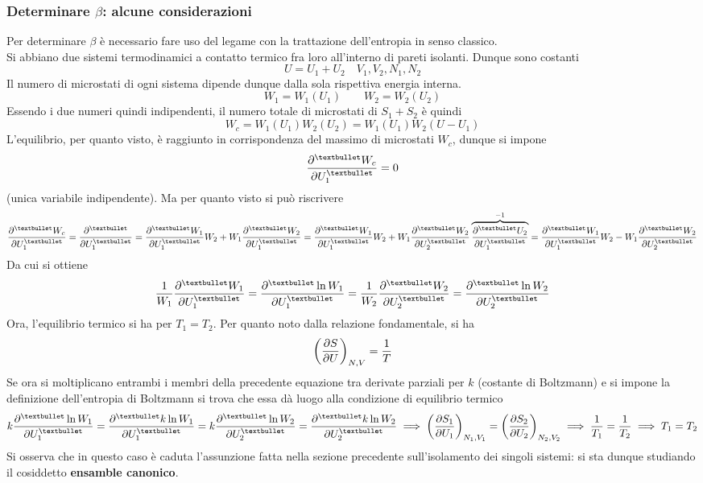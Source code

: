 \documentclass[10pt, oneside]{book}
\begin{document}
\subsubsection*{Determinare $\beta$: alcune considerazioni}
Per determinare $\beta$ è necessario fare uso del legame con la trattazione dell'entropia in senso classico.\\
Si abbiano due sistemi termodinamici a contatto termico fra loro all'interno di pareti isolanti. Dunque sono costanti
\[U = U_1 + U_2 \quad V_1, V_2, N_1, N_2\]
Il numero di microstati di ogni sistema dipende dunque dalla sola rispettiva energia interna.
\[W_1 = W_1(U_1) \qquad W_2 = W_2(U_2)\]
Essendo i due numeri quindi indipendenti, il numero totale di microstati di $S_1 + S_2$ è quindi
\[W_c = W_1 (U_1) W_2(U_2) = W_1(U_1) W_2(U - U_1)\]
L'equilibrio, per quanto visto, è raggiunto in corrispondenza del massimo di microstati $W_c$, dunque si impone
\[\pdv[•]{W_c}{U_1} = 0\]
(unica variabile indipendente). Ma per quanto visto si può riscrivere
\[\pdv[•]{W_c}{U_1} = \pdv[•]{}{U_1}(W_1 \cdot W_2) = \pdv[•]{W_1}{U_1} W_2 + W_1 \pdv[•]{W_2}{U_1} = \pdv[•]{W_1}{U_1} W_2 + W_1 \pdv[•]{W_2}{U_2}\overbrace{\pdv[•]{U_2}{U_1}}^{-1} = \pdv[•]{W_1}{U_1} W_2 - W_1 \pdv[•]{W_2}{U_2}\]
Da cui si ottiene
\[\frac{1}{W_1} \pdv[•]{W_1}{U_1} = \pdv[•]{\ln W_1}{U_1} = \frac{1}{W_2} \pdv[•]{W_2}{U_2} = \pdv[•]{\ln W_2}{U_2}\]
Ora, l'equilibrio termico si ha per $T_1 = T_2$. Per quanto noto dalla relazione fondamentale, si ha
\[\bigg(\pdv{S}{U}\bigg)_{N,V} = \frac{1}{T}\]
Se ora si moltiplicano entrambi i membri della precedente equazione tra derivate parziali per $k$ (costante di Boltzmann) e si impone la definizione dell'entropia di Boltzmann si trova che essa dà luogo alla condizione di equilibrio termico
\[k \pdv[•]{\ln W_1}{U_1} = \pdv[•]{k\ln W_1}{U_1} = k \pdv[•]{\ln W_2}{U_2} = \pdv[•]{k\ln W_2}{U_2} \implies \bigg(\pdv{S_1}{U_1}\bigg)_{N_1, V_1} = \bigg(\pdv{S_2}{U_2}\bigg)_{N_2, V_2} \implies \frac{1}{T_1} = \frac{1}{T_2} \implies T_1 = T_2\]
Si osserva che in questo caso è caduta l'assunzione fatta nella sezione precedente sull'isolamento dei singoli sistemi: si sta dunque studiando il cosiddetto \textbf{ensamble canonico}.
\end{document}
